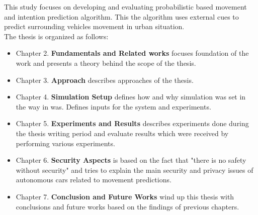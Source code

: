 This study focuses on developing and evaluating probabilistic based movement and intention prediction algorithm. This
the algorithm uses external cues to predict surrounding vehicles movement in urban situation. \\
The thesis is organized as follows:
\begin{itemize}
	\item Chapter 2. \textbf{Fundamentals and Related works} focuses foundation of the work and presents a theory behind the scope of the thesis.
	\item Chapter 3. \textbf{Approach} describes approaches of the thesis.
	\item Chapter 4. \textbf{Simulation Setup} defines how and why simulation was set in the way in was. Defines inputs for the system and experiments.
	\item Chapter 5. \textbf{Experiments and Results} describes experiments done during the thesis writing period and evaluate results which were received by performing various experiments.
	\item Chapter 6. \textbf{Security Aspects} is based on the fact that "there is no safety without security" and tries to explain the main security and privacy issues of autonomous cars related to movement predictions.
	\item Chapter 7. \textbf{Conclusion and Future Works} wind up this thesis with conclusions and future works based on the findings of previous chapters.
\end{itemize}